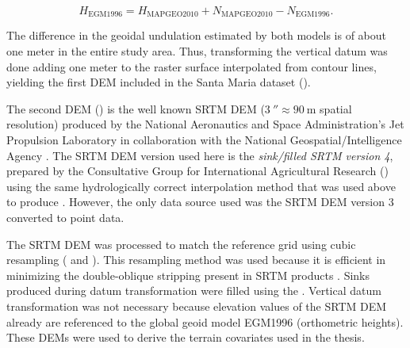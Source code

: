 \begin{equation}
 H_{\text{EGM1996}} = H_{\text{MAPGEO2010}} + N_{\text{MAPGEO2010}} - N_{\text{EGM1996}}.
\end{equation}

\noindent The difference in the geoidal undulation estimated by both models is of about one meter in the 
entire study area. Thus, transforming the vertical datum was done adding one meter to the raster surface 
interpolated from contour lines, yielding the first DEM included in the Santa Maria dataset (\demNew{}).

The second DEM (\demOld{}) is the well known SRTM DEM ($\SI{3}{\arcsecond} \approx \SI{90}{\m}$ spatial 
resolution) produced by the National Aeronautics and Space Administration’s Jet Propulsion Laboratory in 
collaboration with the National Geospatial\-/Intelligence Agency \cite{RodriguezEtAl2006}. The SRTM DEM version 
used here is the \emph{sink\-/filled SRTM version \num{4}}, prepared by the Consultative Group for 
International Agricultural Research (\cgiar) using the same hydrologically correct interpolation method that 
was used above to produce \demNew{} \cite{ReuterEtAl2007, JarvisEtAl2008}. However, the only data source used 
was the SRTM DEM version 3 converted to point data.

The SRTM DEM was processed to match the reference grid using cubic resampling ( and 
). This resampling method was used because it is efficient in minimizing the 
double-oblique stripping present in SRTM products \cite{Samuel-RosaEtAl2013c}. Sinks produced during datum 
transformation were filled using the . Vertical datum transformation was not necessary 
because elevation values of the SRTM DEM already are referenced to the global geoid model EGM1996 
(orthometric heights). These DEMs were used to derive the terrain covariates used in the thesis. 

